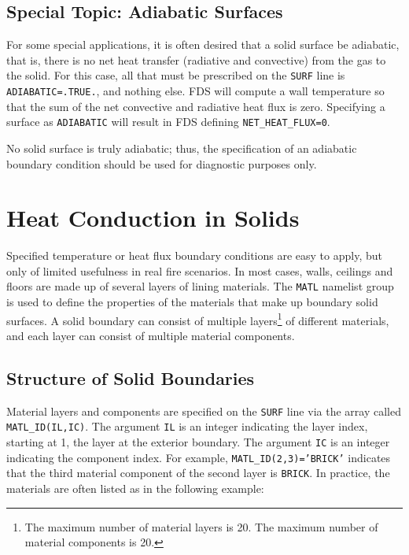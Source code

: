 \documentclass[11pt]{book}
\newcommand{\ct}{\tt\small}
\begin{document}
\subsection{Special Topic: Adiabatic Surfaces}
\label{info:adiabatic}

For some special applications, it is often desired that a solid
surface be adiabatic, that is, there is no net heat transfer
(radiative and convective) from the gas to the solid. For this case,
all that must be prescribed on the {\ct SURF} line is {\ct ADIABATIC=.TRUE.}, and nothing else.  FDS will compute a wall temperature
so that the sum of the net convective and radiative heat flux is zero.  Specifying a surface as {\ct ADIABATIC} will
result in FDS defining {\ct NET\_HEAT\_FLUX=0}.

\begin{warning}
No solid surface is truly adiabatic; thus, the specification of an adiabatic boundary condition should be used for diagnostic purposes only.
\end{warning}



\clearpage


\section{Heat Conduction in Solids}
\label{info:MATL}

Specified temperature or heat flux boundary conditions are
easy to apply, but only of limited usefulness in real fire scenarios.
In most cases, walls, ceilings and floors are made up of several layers
of lining materials. The {\ct MATL} namelist group is used to define the properties of the materials that make
up boundary solid surfaces. A solid boundary can consist of
multiple layers\footnote{The maximum number of material layers is 20. The maximum number of material components is 20.} of different
materials, and each layer can consist of multiple material
components.

\subsection{Structure of Solid Boundaries}

Material layers and components are
specified on the {\ct SURF} line via the array called {\ct MATL\_ID(IL,IC)}.
The argument {\ct IL} is an integer indicating the
layer index, starting at 1, the layer at the exterior boundary. The
argument {\ct IC} is an integer indicating the component index. For
example, {\ct MATL\_ID(2,3)='BRICK'} indicates that the third material
component of the second layer is {\ct BRICK}. In practice, the
materials are often listed as in the following example:
\end{document}
